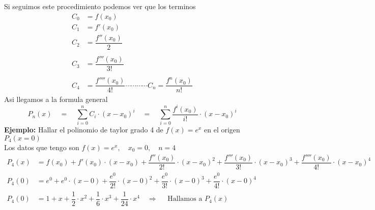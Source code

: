 Si seguimos este procedimiento podemos ver que los terminos 
\begin{equation*}
\begin{split}
 C_{0} &= f(x_{0})  \\
 C_{1} &= f'(x_{0})  \\
 C_{2} &=    \dfrac{f''(x_{0})}{2} \\ \\
 C_{3} &=    \dfrac{f'''(x_{0})}{3!} \\ \\
 C_{4} &=    \dfrac{f''''(x_{0})}{4!} 	\cdots \cdots \cdots \cdots C_{n} =    \dfrac{f^{n}(x_{0})}{n!}
\end{split}
\end{equation*}
Asi llegamos a la formula general 
\[
P_{n}(x) \quad = \quad \displaystyle\sum_{i=0}^n C_{i} \cdot (x-x_{0})^{i} \quad =  \quad \displaystyle\sum_{i=0}^n \dfrac{f^{i}(x_{0})}{i!} \cdot (x-x_{0})^{i}
\]
\textbf{Ejemplo: } Hallar el polinomio de taylor grado 4 de $f(x)=e^{x}$ en el origen $ P_{4}(x= 0)$ \\
Los datos que tengo son $ f(x)=e^{x}, \quad x_{0}= 0, \quad n = 4  $
\begin{equation*}
\begin{split}
P_{4}(x) &= f(x_{0}) + f'(x_{0})\cdot (x-x_{0}) + \dfrac{f''(x_{0})}{2!} \cdot (x-x_{0})^{2} + \dfrac{f'''(x_{0})}{3!} \cdot (x-x_{0})^{3} + \dfrac{f''''(x_{0})}{4!} \cdot (x-x_{0})^{4} \\
P_{4}(0) &= e^{0} + e^{0} \cdot (x-0) + \dfrac{e^{0}}{2!} \cdot (x-0)^{2} + \dfrac{e^{0}}{3!} \cdot (x-0)^{3} + \dfrac{e^{0}}{4!} \cdot (x-0)^{4} \\
P_{4}(0) &= 1 + x + \dfrac{1}{2} \cdot x^{2} + \dfrac{1}{6} \cdot x^{3} + \dfrac{1}{24} \cdot x^{4} \quad \Rightarrow \quad \text{ Hallamos a } P_{4}(x)\\
\end{split}
\end{equation*}


